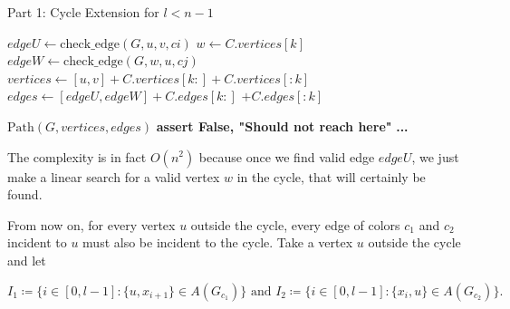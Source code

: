 \begin{algorithm}[H]
    \caption{Part 1: Cycle Extension for \( l < n - 1 \)}
    \begin{algorithmic}
            \For{$[ci, cj] \in [[c1, c2], [c2, c1]]$} 
                            \State $edgeU \gets \text{check\_edge}(G, u, v, ci)$
                                    \State $w \gets C.vertices[k]$
                                    \State $edgeW \gets \text{check\_edge}(G, w, u, cj)$
                                        \State $vertices \gets [u, v] + C.vertices[k:] + C.vertices[:k]$
                                        \State $edges \gets [edgeU, edgeW] + C.edges[k:]$
                                        \State \hspace{3em} $+ C.edges[:k]$
                                        
                                        \State \Return $\text{Path}(G, vertices, edges)$
                                    \EndIf
                                \EndFor
                                \State \textbf{assert False, "Should not reach here"}
                            \EndIf
                        \EndIf
                    \EndFor
                \EndFor
            \EndFor
            \State \textbf{...}
        \EndFunction
    \end{algorithmic}
\end{algorithm}

The complexity is in fact $O(n^2)$ because once we find valid edge $edgeU$, we 
just make a linear search for a valid vertex $w$ in the cycle, that will 
certainly be found.

From now on, for every vertex $u$ outside the cycle, every edge of colors $c_1$ and $c_2$ incident to 
$u$ must also be incident to the cycle. 
Take a vertex $u$ outside the cycle and let

$$
I_1 \coloneqq \{i \in [0, l - 1]: \{u, x_{i + 1}\} \in A(G_{c_1})\} \text{ and } I_2 \coloneqq \{i \in [0, l - 1]: \{x_i, u\} \in A(G_{c_2})\}.
$$

